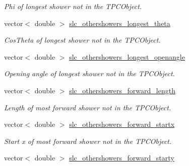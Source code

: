 \begin{DoxyCompactItemize}
\begin{DoxyCompactList}\small\item\em Phi of longest shower not in the T\-P\-C\-Object. \end{DoxyCompactList}\item 
\hypertarget{classUBXSecEvent_a5750b8ea2fc8ff38bf4d9c478635b602}{vector$<$ double $>$ \hyperlink{classUBXSecEvent_a5750b8ea2fc8ff38bf4d9c478635b602}{slc\-\_\-othershowers\-\_\-longest\-\_\-theta}}\label{classUBXSecEvent_a5750b8ea2fc8ff38bf4d9c478635b602}

\begin{DoxyCompactList}\small\item\em Cos\-Theta of longest shower not in the T\-P\-C\-Object. \end{DoxyCompactList}\item 
\hypertarget{classUBXSecEvent_a7460ed30abe2074204ed5065c21d9877}{vector$<$ double $>$ \hyperlink{classUBXSecEvent_a7460ed30abe2074204ed5065c21d9877}{slc\-\_\-othershowers\-\_\-longest\-\_\-openangle}}\label{classUBXSecEvent_a7460ed30abe2074204ed5065c21d9877}

\begin{DoxyCompactList}\small\item\em Opening angle of longest shower not in the T\-P\-C\-Object. \end{DoxyCompactList}\item 
\hypertarget{classUBXSecEvent_a7ae1fe5c2f338ebbb8a3d9ca5f507f00}{vector$<$ double $>$ \hyperlink{classUBXSecEvent_a7ae1fe5c2f338ebbb8a3d9ca5f507f00}{slc\-\_\-othershowers\-\_\-forward\-\_\-length}}\label{classUBXSecEvent_a7ae1fe5c2f338ebbb8a3d9ca5f507f00}

\begin{DoxyCompactList}\small\item\em Length of most forward shower not in the T\-P\-C\-Object. \end{DoxyCompactList}\item 
\hypertarget{classUBXSecEvent_a81105357facd42aa6807e4e75158cbb2}{vector$<$ double $>$ \hyperlink{classUBXSecEvent_a81105357facd42aa6807e4e75158cbb2}{slc\-\_\-othershowers\-\_\-forward\-\_\-startx}}\label{classUBXSecEvent_a81105357facd42aa6807e4e75158cbb2}

\begin{DoxyCompactList}\small\item\em Start x of most forward shower not in the T\-P\-C\-Object. \end{DoxyCompactList}\item 
\hypertarget{classUBXSecEvent_acae6b15c69e2c24b2a303a2b78f53082}{vector$<$ double $>$ \hyperlink{classUBXSecEvent_acae6b15c69e2c24b2a303a2b78f53082}{slc\-\_\-othershowers\-\_\-forward\-\_\-starty}}\label{classUBXSecEvent_acae6b15c69e2c24b2a303a2b78f53082}


\end{DoxyCompactItemize}
